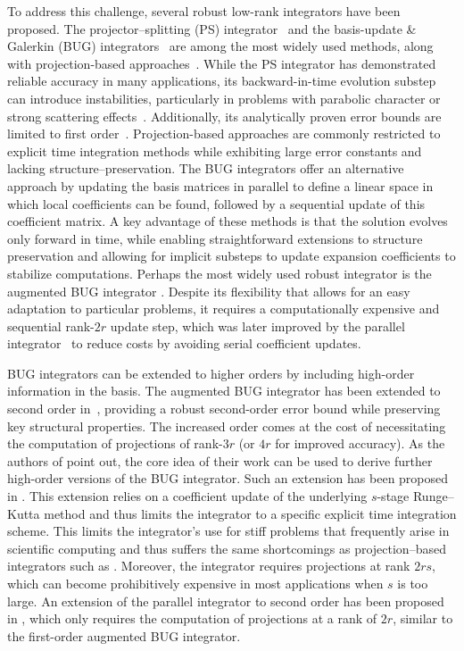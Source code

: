 \documentclass[preprint,runningheads]{svjour3}
\begin{document}
To address this challenge, several robust low-rank integrators have been proposed. The projector--splitting (PS) integrator~\cite{LubichOseledets,KieriLubichWalach} and the basis-update \& Galerkin (BUG) integrators~\cite{CeL22,CeKL22,CeKL23,ceruti2024robust} are among the most widely used methods, along with projection-based approaches~\cite{KiV19,charous2023dynamically,SeCK23}. While the PS integrator has demonstrated reliable accuracy in many applications, its backward-in-time evolution substep can introduce instabilities, particularly in problems with parabolic character or strong scattering effects~\cite{kusch2021stability,einkemmer2024asymptotic}. Additionally, its analytically proven error bounds are limited to first order~\cite{KieriLubichWalach}. Projection-based approaches are commonly restricted to explicit time integration methods while exhibiting large error constants and lacking structure--preservation. The BUG integrators offer an alternative approach by updating the basis matrices in parallel to define a linear space in which local coefficients can be found, followed by a sequential update of this coefficient matrix. A key advantage of these methods is that the solution evolves only forward in time, while enabling straightforward extensions to structure preservation \cite{einkemmer2023conservation} and allowing for implicit substeps to update expansion coefficients to stabilize computations. Perhaps the most widely used robust integrator is the augmented BUG integrator \cite{ceruti2023rank}. Despite its flexibility that allows for an easy adaptation to particular problems, it requires a computationally expensive and sequential rank-$2r$ update step, which was later improved by the parallel integrator~\cite{CeKL23} to reduce costs by avoiding serial coefficient updates.

BUG integrators can be extended to higher orders by including high-order information in the basis. The augmented BUG integrator has been extended to second order in~\cite{ceruti2024robust}, providing a robust second-order error bound while preserving key structural properties. The increased order comes at the cost of necessitating the computation of projections of rank-$3r$ (or $4r$ for improved accuracy). As the authors of \cite{ceruti2024robust} point out, the core idea of their work can be used to derive further high-order versions of the BUG integrator. Such an extension has been proposed in \cite{nobile2025robust}. This extension relies on a coefficient update of the underlying $s$-stage Runge--Kutta method and thus limits the integrator to a specific explicit time integration scheme. This limits the integrator's use for stiff problems that frequently arise in scientific computing and thus suffers the same shortcomings as projection--based integrators such as \cite{KiV19}. Moreover, the integrator requires projections at rank $2rs$, which can become prohibitively expensive in most applications when $s$ is too large. An extension of the parallel integrator to second order has been proposed in \cite{kusch2024second}, which only requires the computation of projections at a rank of $2r$, similar to the first-order augmented BUG integrator.
\end{document}
